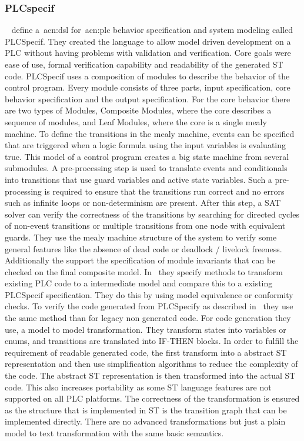 \subsubsection{PLCspecif}
\label{sec:sub:plfspecif}

\citeauthor{7819191}~\cite{7819191, darvas2015syntax, darvas2015requirements, darvas2015formal, 10.1007/978-3-319-33693-0_32} define a~\acrshort{acn:dsl} for~\acrshort{acn:plc} behavior specification and system modeling called PLCSpecif.
They created the language to allow model driven development on a PLC without having problems with validation and verification.
Core goals were ease of use, formal verification capability and readability of the generated ST code.
PLCSpecif uses a composition of modules to describe the behavior of the control program.
Every module consists of three parts, input specification, core behavior specification and the output specification.
For the core behavior there are two types of Modules, Composite Modules, where the core describes a sequence of modules, and Leaf Modules, where the core is a single mealy machine.
To define the transitions in the mealy machine, events can be specified that are triggered when a logic formula using the input variables is evaluating true.
This model of a control program creates a big state machine from several submodules.
A pre-processing step is used to translate events and conditionals into transitions that use guard variables and active state variables.
Such a pre-processing is required to ensure that the transitions run correct and no errors such as infinite loops or non-determinism are present.
After this step, a SAT solver can verify the correctness of the  transitions by searching for directed cycles of non-event transitions or multiple transitions from one node with equivalent guards.
They use the mealy machine structure of the system to verify some general features like the absence of dead code or deadlock / livelock freeness.
Additionally the support the specification of module invariants that can be checked on the final composite model.
In~\cite{10.1007/978-3-319-33693-0_32} they specify methods to transform existing PLC code to a intermediate model and compare this to a existing PLCSpecif specification.
They do this by using model equivalence or conformity checks.
To verify the code generated from PLCSpecify as described in~\cite{7819191} they use the same method than for legacy non generated code.
For code generation they use, a model to model transformation.
They transform states into variables or enums, and transitions are translated into IF-THEN blocks.
In order to fulfill the requirement of readable generated code, the first transform into a abstract ST representation and then use simplification algorithms to reduce the complexity of the code.
The abstract ST representation is then transformed into the actual ST code.
This also increases portability as some ST language features are not supported on all PLC platforms.
The correctness of the transformation is ensured as the structure that is implemented in ST is the transition graph that can be implemented directly.
There are no advanced transformations but just a plain model to text transformation with the same basic semantics.
